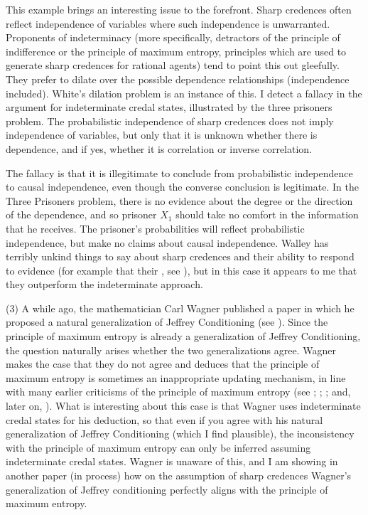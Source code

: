 \documentclass[11pt]{article}
\begin{document}
This example brings an interesting issue to the forefront. Sharp
credences often reflect independence of variables where such
independence is unwarranted. Proponents of indeterminacy (more
specifically, detractors of the principle of indifference or the
principle of maximum entropy, principles which are used to generate
sharp credences for rational agents) tend to point this out gleefully.
They prefer to dilate over the possible dependence relationships
(independence included). White's dilation problem is an instance of
this. I detect a fallacy in the argument for indeterminate credal
states, illustrated by the three prisoners problem. The probabilistic
independence of sharp credences does not imply independence of
variables, but only that it is unknown whether there is dependence,
and if yes, whether it is correlation or inverse correlation. 

The fallacy is that it is illegitimate to conclude from probabilistic
independence to causal independence, even though the converse
conclusion is legitimate. In the Three Prisoners problem, there is no
evidence about the degree or the direction of the dependence, and so
prisoner $X_{1}$ should take no comfort in the information that he
receives. The prisoner's probabilities will reflect probabilistic
independence, but make no claims about causal independence. Walley has
terribly unkind things to say about sharp credences and their ability
to respond to evidence (for example that their , see ), but in
this case it appears to me that they outperform the indeterminate
approach.

(3) A while ago, the mathematician Carl Wagner published a paper in
which he proposed a natural generalization of Jeffrey Conditioning
(see ). Since the principle of maximum entropy is
already a generalization of Jeffrey Conditioning, the question
naturally arises whether the two generalizations agree. Wagner makes
the case that they do not agree and deduces that the principle of
maximum entropy is sometimes an inappropriate updating mechanism, in
line with many earlier criticisms of the principle of maximum entropy
(see ; ;
; and, later on,
). What is interesting about this case is
that Wagner uses indeterminate credal states for his deduction, so
that even if you agree with his natural generalization of Jeffrey
Conditioning (which I find plausible), the inconsistency with the
principle of maximum entropy can only be inferred assuming
indeterminate credal states. Wagner is unaware of this, and I am
showing in another paper (in process) how on the assumption of sharp
credences Wagner's generalization of Jeffrey conditioning perfectly
aligns with the principle of maximum entropy.
\end{document}
